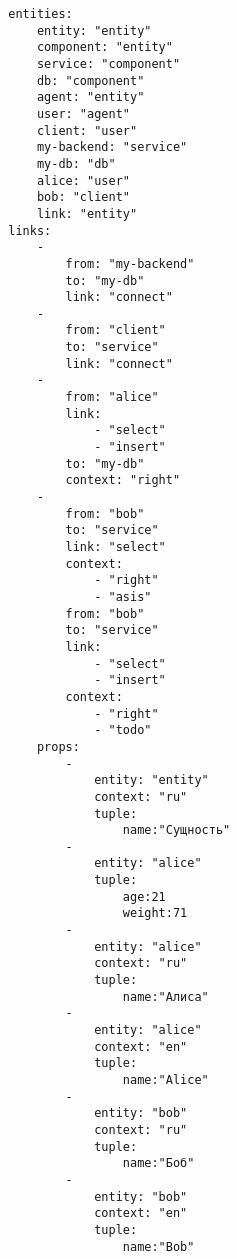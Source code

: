 \documentclass[final]{article}
\begin{document}
        \begin{verbatim}
        entities:
            entity: "entity"
            component: "entity"
            service: "component"
            db: "component"
            agent: "entity"
            user: "agent"
            client: "user"
            my-backend: "service"
            my-db: "db"
            alice: "user"
            bob: "client"
            link: "entity"
        links:         
            -              
                from: "my-backend"
                to: "my-db"
                link: "connect"
            -
                from: "client"
                to: "service"
                link: "connect"
            -              
                from: "alice"
                link:
                    - "select"
                    - "insert"
                to: "my-db"
                context: "right"
            - 
                from: "bob" 
                to: "service"
                link: "select"
                context: 
                    - "right"
                    - "asis"
                from: "bob" 
                to: "service"
                link:
                    - "select"
                    - "insert"
                context: 
                    - "right"
                    - "todo"
            props:
                -
                    entity: "entity"
                    context: "ru"
                    tuple: 
                        name:"Сущность"
                -
                    entity: "alice"
                    tuple: 
                        age:21
                        weight:71
                -
                    entity: "alice"
                    context: "ru"
                    tuple: 
                        name:"Алиса"
                -
                    entity: "alice"
                    context: "en"
                    tuple: 
                        name:"Alice"
                -
                    entity: "bob"
                    context: "ru"
                    tuple: 
                        name:"Боб"
                -
                    entity: "bob"
                    context: "en"
                    tuple: 
                        name:"Bob"
        \end{verbatim}
\end{document}
